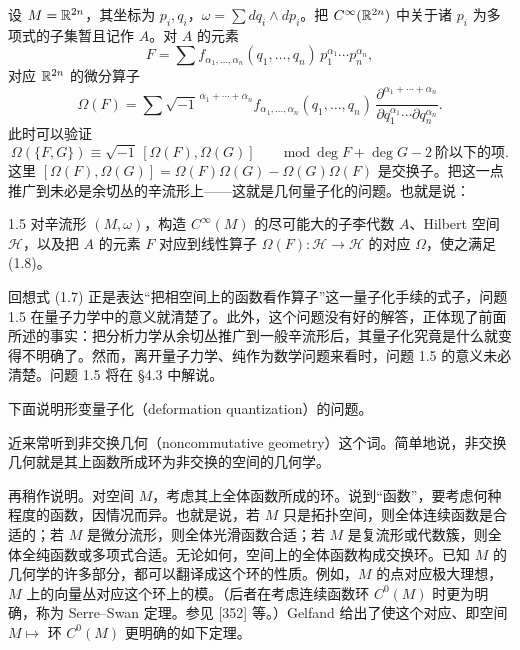 设 $M=\mathbb{R}^{2n}$，其坐标为 $p_i,q_i$，$\omega=\sum dq_i\wedge dp_i$。把 $C^\infty(\mathbb{R}^{2n})$ 中关于诸 $p_i$ 为多项式的子集暂且记作 $A$。对 $A$ 的元素
\[
  F=\sum f_{\alpha_1,\dots,\alpha_n}(q_1,\dots,q_n)\,p_1^{\alpha_1}\cdots p_n^{\alpha_n},
\]
对应 $\mathbb{R}^{2n}$ 的微分算子
\begin{equation}
  \Omega(F)=\sum \sqrt{-1}^{\,\alpha_1+\cdots+\alpha_n}
  f_{\alpha_1,\dots,\alpha_n}(q_1,\dots,q_n)\,
  \frac{\partial^{\alpha_1+\cdots+\alpha_n}}{\partial q_1^{\alpha_1}\cdots\partial q_n^{\alpha_n}}. \tag{1.7}
\end{equation}
此时可以验证
\begin{equation}
  \Omega(\{F,G\})\equiv \sqrt{-1}\,[\Omega(F),\Omega(G)]
  \qquad \mathrm{mod}\ \deg F+\deg G-2\ \text{阶以下的项}. \tag{1.8}
\end{equation}
这里 $[\Omega(F),\Omega(G)]=\Omega(F)\Omega(G)-\Omega(G)\Omega(F)$ 是交换子。把这一点推广到未必是余切丛的辛流形上——这就是几何量子化的问题。也就是说：

\begin{problem}{1.5}
  对辛流形 $(M,\omega)$，构造 $C^\infty(M)$ 的尽可能大的子李代数 $A$、Hilbert 空间 $\mathcal{H}$，以及把 $A$ 的元素 $F$ 对应到线性算子 $\Omega(F)\colon\mathcal{H}\to\mathcal{H}$ 的对应 $\Omega$，使之满足 (1.8)。
\end{problem}

回想式 (1.7) 正是表达“把相空间上的函数看作算子”这一量子化手续的式子，问题 1.5 在量子力学中的意义就清楚了。此外，这个问题没有好的解答，正体现了前面所述的事实：把分析力学从余切丛推广到一般辛流形后，其量子化究竟是什么就变得不明确了。然而，离开量子力学、纯作为数学问题来看时，问题 1.5 的意义未必清楚。问题 1.5 将在 §4.3 中解说。

下面说明形变量子化（deformation quantization）的问题。

近来常听到非交换几何（noncommutative geometry）这个词。简单地说，非交换几何就是其上函数所成环为非交换的空间的几何学。

再稍作说明。对空间 $M$，考虑其上全体函数所成的环。说到“函数”，要考虑何种程度的函数，因情况而异。也就是说，若 $M$ 只是拓扑空间，则全体连续函数是合适的；若 $M$ 是微分流形，则全体光滑函数合适；若 $M$ 是复流形或代数簇，则全体全纯函数或多项式合适。无论如何，空间上的全体函数构成交换环。已知 $M$ 的几何学的许多部分，都可以翻译成这个环的性质。例如，$M$ 的点对应极大理想，$M$ 上的向量丛对应这个环上的模。（后者在考虑连续函数环 $C^0(M)$ 时更为明确，称为 Serre–Swan 定理。参见 [352] 等。）Gelfand 给出了使这个对应、即空间 $M\mapsto$ 环 $C^0(M)$ 更明确的如下定理。


